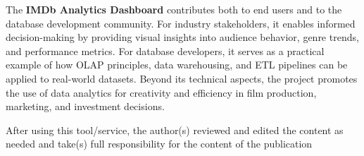 The \textbf{IMDb Analytics Dashboard} contributes both to end users and to the database development community. For industry stakeholders, it enables informed decision-making by providing visual insights into audience behavior, genre trends, and performance metrics. For database developers, it serves as a practical example of how OLAP principles, data warehousing, and ETL pipelines can be applied to real-world datasets. Beyond its technical aspects, the project promotes the use of data analytics for creativity and efficiency in film production, marketing, and investment decisions.



After using this tool/service, the author(s) reviewed and edited the content as needed and take(s) full responsibility for the content of the publication
